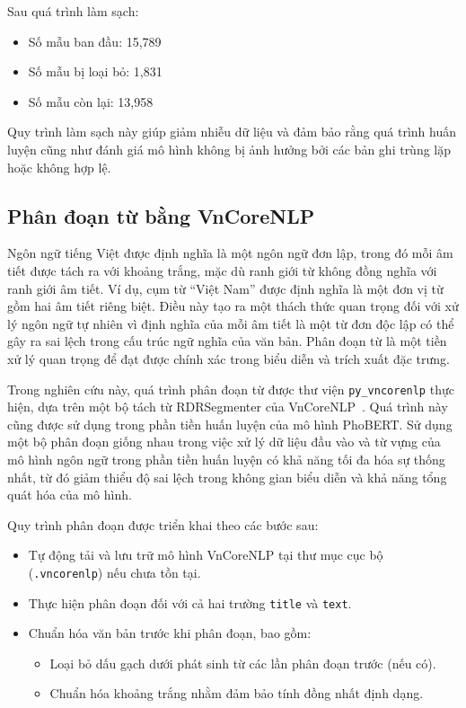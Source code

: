 \documentclass[12pt, a4paper]{report}
\newcommand{\nRaw}{15,789}              %
\newcommand{\nRemoved}{1,831}            %
\newcommand{\nClean}{13,958}             %
\begin{document}
Sau quá trình làm sạch:

\begin{itemize}[leftmargin=2em]
  \item Số mẫu ban đầu: \nRaw
  \item Số mẫu bị loại bỏ: \nRemoved
  \item Số mẫu còn lại: \nClean
\end{itemize}

Quy trình làm sạch này giúp giảm nhiễu dữ liệu và đảm bảo rằng 
quá trình huấn luyện cũng như đánh giá mô hình không bị ảnh hưởng 
bởi các bản ghi trùng lặp hoặc không hợp lệ.

\subsection{Phân đoạn từ bằng VnCoreNLP}

Ngôn ngữ tiếng Việt được định nghĩa là một ngôn ngữ đơn lập, trong đó mỗi âm tiết được tách ra với khoảng trắng, mặc dù ranh giới từ không đồng nghĩa với ranh giới âm tiết. Ví dụ, cụm từ ``Việt Nam'' được định nghĩa là một đơn vị từ gồm hai âm tiết riêng biệt. Điều này tạo ra một thách thức quan trọng đối với xử lý ngôn ngữ tự nhiên vì định nghĩa của mỗi âm tiết là một từ đơn độc lập có thể gây ra sai lệch trong cấu trúc ngữ nghĩa của văn bản. Phân đoạn từ là một tiền xử lý quan trọng để đạt được chính xác trong biểu diễn và trích xuất đặc trưng.

Trong nghiên cứu này, quá trình phân đoạn từ được thư viện \texttt{py\_vncorenlp} thực hiện, dựa trên một bộ tách từ RDRSegmenter của VnCoreNLP~\cite{nguyen2018vncorenlp}. Quá trình này cũng được sử dụng trong phần tiền huấn luyện của mô hình PhoBERT. Sử dụng một bộ phân đoạn giống nhau trong việc xử lý dữ liệu đầu vào và từ vựng của mô hình ngôn ngữ trong phần tiền huấn luyện có khả năng tối đa hóa sự thống nhất, từ đó giảm thiểu độ sai lệch trong không gian biểu diễn và khả năng tổng quát hóa của mô hình.

Quy trình phân đoạn được triển khai theo các bước sau:

\begin{itemize}[leftmargin=2em]
  \item Tự động tải và lưu trữ mô hình VnCoreNLP tại thư mục cục bộ (\texttt{.vncorenlp}) nếu chưa tồn tại.
  \item Thực hiện phân đoạn đối với cả hai trường \texttt{title} và \texttt{text}.
  \item Chuẩn hóa văn bản trước khi phân đoạn, bao gồm:
  \begin{itemize}
    \item Loại bỏ dấu gạch dưới phát sinh từ các lần phân đoạn trước (nếu có).
    \item Chuẩn hóa khoảng trắng nhằm đảm bảo tính đồng nhất định dạng.
  \end{itemize}
\end{itemize}
\end{document}
